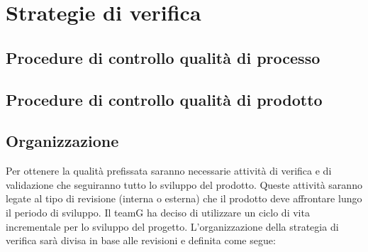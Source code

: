 \section{Strategie di verifica}
\subsection{Procedure di controllo qualità di processo}


\subsection{Procedure di controllo qualità di prodotto}


\subsection{Organizzazione}
Per ottenere la qualità prefissata saranno necessarie attività di verifica e di validazione che seguiranno tutto lo sviluppo del prodotto. Queste attività saranno legate al tipo di revisione (interna o esterna) che il prodotto deve affrontare lungo il periodo di sviluppo. Il teamG ha deciso di utilizzare un ciclo di vita incrementale per lo sviluppo del progetto. L’organizzazione della strategia di verifica sarà divisa in base alle revisioni e definita come segue:
